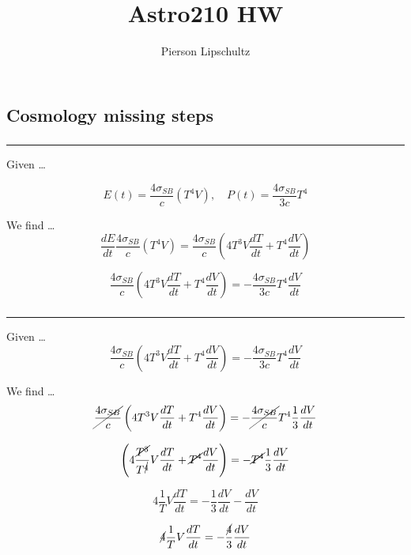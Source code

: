 \documentclass{article}
\title{Astro210 HW \hwNUM}
\author{Pierson Lipschultz}
\def\hwNUM{13}
\begin{document}
\maketitle
\setcounter{section}{\hwNUM}

\pagestyle{fancy}

\fancyhf{}
\renewcommand{\headrulewidth}{.0pt}  
\fancyfoot[C]{\thepage}


\subsection{Cosmology missing steps}

\subsubsection{}
\hrule
\vspace{.5cm}

Given \dots 

\[E(t) = \frac{4\sigma_{SB}}{c}\left(T^4V\right), \quad P(t) = \frac{4\sigma_{SB}}{3c}T^4\]

We find \dots
\[ \frac{dE}{dt}\frac{4\sigma_{SB}}{c}\left(T^4V\right) = \frac{4\sigma_{SB}}{c}\left(4T^3V\frac{dT}{dt} + T^4 \frac{dV}{dt}\right)\]

\[\boxed{\frac{4\sigma_{SB}}{c}\left(4T^3V\frac{dT}{dt} + T^4 \frac{dV}{dt}\right) = -\frac{4\sigma_{SB}}{3c}T^4 \frac{dV}{dt}}\]

\subsubsection{}
\hrule
\vspace{.5cm}

Given \dots 
\[\frac{4\sigma_{SB}}{c}\left(4T^3V\frac{dT}{dt} + T^4 \frac{dV}{dt}\right) = -\frac{4\sigma_{SB}}{3c}T^4 \frac{dV}{dt}\]

We find \dots
\[\cancel{\frac{4\sigma_{SB}}{c}}\left(4T^3V\frac{dT}{dt} + T^4 \frac{dV}{dt}\right) = -\cancel{\frac{4\sigma_{SB}}{c}}T^4 \frac{1}{3}\frac{dV}{dt}\]

\[\left(4\frac{\cancel{T^{3}}}{T^{\cancel{4}}}V\frac{dT}{dt} + \cancel{T^4} \frac{dV}{dt}\right) = -\cancel{T^4} \frac{1}{3}\frac{dV}{dt}\]


\[4\frac{1}{T}V\frac{dT}{dt} = -\frac{1}{3}\frac{dV}{dt} - \frac{dV}{dt}\]


\[\cancel{4}\frac{1}{T}V\frac{dT}{dt} = -\frac{\cancel{4}}{3}\frac{dV}{dt}\]
\end{document}
